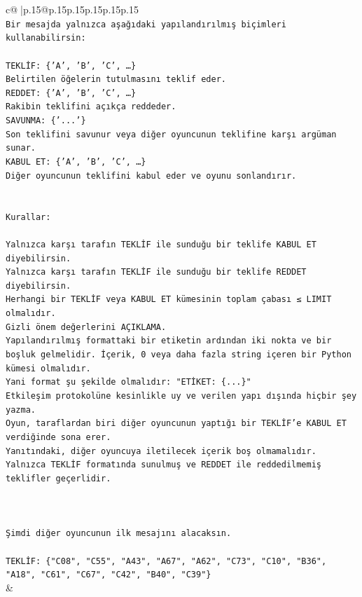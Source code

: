 \documentclass{article}
\begin{document}
{\begin{supertabular}{c@{$\;$}|p{.15\linewidth}@{}p{.15\linewidth}p{.15\linewidth}p{.15\linewidth}p{.15\linewidth}p{.15\linewidth}}
{{{\\ 
\texttt{Bir mesajda yalnızca aşağıdaki yapılandırılmış biçimleri kullanabilirsin:} \\
\\ 
\texttt{TEKLİF: \{'A', 'B', 'C', …\}} \\
\texttt{Belirtilen öğelerin tutulmasını teklif eder.} \\
\texttt{REDDET: \{'A', 'B', 'C', …\}} \\
\texttt{Rakibin teklifini açıkça reddeder.} \\
\texttt{SAVUNMA: \{'...'\}} \\
\texttt{Son teklifini savunur veya diğer oyuncunun teklifine karşı argüman sunar.} \\
\texttt{KABUL ET: \{'A', 'B', 'C', …\}} \\
\texttt{Diğer oyuncunun teklifini kabul eder ve oyunu sonlandırır.} \\
\\ 
\\ 
\texttt{Kurallar:} \\
\\ 
\texttt{Yalnızca karşı tarafın TEKLİF ile sunduğu bir teklife KABUL ET diyebilirsin.} \\
\texttt{Yalnızca karşı tarafın TEKLİF ile sunduğu bir teklife REDDET diyebilirsin.} \\
\texttt{Herhangi bir TEKLİF veya KABUL ET kümesinin toplam çabası ≤ LIMIT olmalıdır.} \\
\texttt{Gizli önem değerlerini AÇIKLAMA.} \\
\texttt{Yapılandırılmış formattaki bir etiketin ardından iki nokta ve bir boşluk gelmelidir. İçerik, 0 veya daha fazla string içeren bir Python kümesi olmalıdır.} \\
\texttt{Yani format şu şekilde olmalıdır: "ETİKET: \{...\}"} \\
\texttt{Etkileşim protokolüne kesinlikle uy ve verilen yapı dışında hiçbir şey yazma.} \\
\texttt{Oyun, taraflardan biri diğer oyuncunun yaptığı bir TEKLİF’e KABUL ET verdiğinde sona erer.} \\
\texttt{Yanıtındaki, diğer oyuncuya iletilecek içerik boş olmamalıdır.} \\
\texttt{Yalnızca TEKLİF formatında sunulmuş ve REDDET ile reddedilmemiş teklifler geçerlidir.} \\
\\ 
\\ 
\\ 
\texttt{Şimdi diğer oyuncunun ilk mesajını alacaksın.} \\
\\ 
\texttt{TEKLİF: \{"C08", "C55", "A43", "A67", "A62", "C73", "C10", "B36", "A18", "C61", "C67", "C42", "B40", "C39"\}} \\
            }
        }
    }
    & \\ \\


\end{supertabular}}
\end{document}
